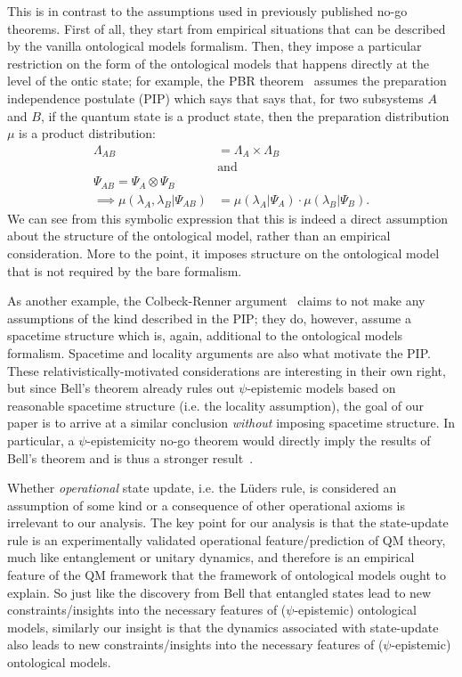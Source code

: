 \documentclass[%
 reprint,
superscriptaddress,
nofootinbib,
 amsmath,amssymb,
 prx, 
 accepted=2019-09-27,
]{quantumarticle}
\begin{document}
This is in contrast to the assumptions used in previously published
no-go theorems. First of all, they start from empirical situations
that can be described by the vanilla ontological models
formalism. Then, they impose a particular restriction on the form of
the ontological models that happens directly at the level of the ontic
state; for example, the PBR
theorem~\cite{Puseyrealityquantumstate2012} assumes the preparation
independence postulate (PIP) which says that says that, for two
subsystems $A$ and $B$, if the quantum state is a product state, then
the preparation distribution $\mu$ is a product distribution:
\begin{align}
  \label{eq:2} \Lambda_{AB} &= \Lambda_A\times\Lambda_B\\
&\text{and}\nonumber\\ \Psi_{AB}=\Psi_A\otimes\Psi_B
\quad&\nonumber\\\implies
\mu(\lambda_A,\lambda_B|\Psi_{AB})&=\mu(\lambda_A|\Psi_A)\cdot\mu(\lambda_B|\Psi_B).
\end{align} We can see from this symbolic expression that this is
indeed a direct assumption about the structure of the ontological
model, rather than an empirical consideration. More to the point, it
imposes structure on the ontological model that is not required by the
bare formalism.

As another example, the Colbeck-Renner
argument~\cite{Colbecksystemwavefunction2017} claims to not make any
assumptions of the kind described in the PIP; they do, however, assume
a spacetime structure which is, again, additional to the ontological
models formalism. Spacetime and locality arguments are also what
motivate the PIP. These relativistically-motivated considerations are
interesting in their own right, but since Bell's theorem already rules
out $\psi$-epistemic models based on reasonable spacetime structure
(i.e. the locality assumption), the goal of our paper is to arrive at
a similar conclusion \emph{without} imposing spacetime structure. In
particular, a $\psi$-epistemicity no-go theorem would directly imply
the results of Bell's theorem and is thus a stronger
result~\cite{Leiferquantumstatereal2014}.

Whether \emph{operational} state update, i.e. the L\"uders rule, is
considered an assumption of some kind or a consequence of other
operational axioms is irrelevant to our analysis.  The key point for
our analysis is that the state-update rule is an experimentally
validated operational feature/prediction of QM theory, much like
entanglement or unitary dynamics, and therefore is an empirical
feature of the QM framework that the framework of ontological models
ought to explain.  So just like the discovery from Bell that entangled
states lead to new constraints/insights into the necessary features of
($\psi$-epistemic) ontological models, similarly our insight is that
the dynamics associated with state-update also leads to new
constraints/insights into the necessary features of ($\psi$-epistemic)
ontological models.
\end{document}
